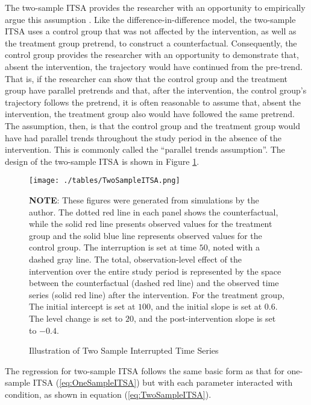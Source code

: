 \documentclass[12pt]{article}
\begin{document}
The two-sample ITSA provides the researcher with an opportunity to empirically argue this assumption \citep{lopezbernalUseControlsInterrupted2018}. Like the difference-in-difference model, the two-sample ITSA uses a control group that was not affected by the intervention, as well as the treatment group pretrend, to construct a counterfactual. Consequently, the control group provides the researcher with an opportunity to demonstrate that, absent the intervention, the trajectory would have continued from the pre-trend. That is, if the researcher can show that the control group and the treatment group have parallel pretrends and that, after the intervention, the control group's trajectory follows the pretrend, it is often reasonable to assume that, absent the intervention, the treatment group also would have followed the same pretrend. The assumption, then, is that the control group and the treatment group would have had parallel trends throughout the study period in the absence of the intervention. This is commonly called the ``parallel trends assumption''. The design of the two-sample ITSA is shown in Figure \ref{fig:TwoSampleITSA}.


\begin{figure}
    \centering
    \caption{Illustration of Two Sample Interrupted Time Series}
    \texttt{[image: ./tables/TwoSampleITSA.png]}
    \begin{minipage}{\textwidth}
    \footnotesize
    \textbf{NOTE}: These figures were generated from simulations by the author. The dotted red line in each panel shows the counterfactual, while the solid red line presents observed values for the treatment group and the solid blue line represents observed values for the control group. The interruption is set at time $50$, noted with a dashed gray line. The total, observation-level effect of the intervention over the entire study period is represented by the space between the counterfactual (dashed red line) and the observed time series (solid red line) after the intervention. For the treatment group, The initial intercept is set at $100$, and the initial slope is set at $0.6$. The level change is set to $20$, and the post-intervention slope is set to $-0.4$.
    \end{minipage}
    \label{fig:TwoSampleITSA}
\end{figure}

The regression for two-sample ITSA follows the same basic form as that for one-sample ITSA (\ref{eq:OneSampleITSA}) but with each parameter interacted with condition, as shown in equation (\ref{eq:TwoSampleITSA}).
\end{document}
